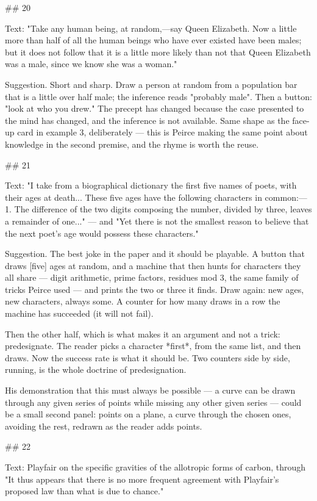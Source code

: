 ## 20

Text: "Take any human being, at random,—say Queen Elizabeth. Now a little more
than half of all the human beings who have ever existed have been males; but it
does not follow that it is a little more likely than not that Queen Elizabeth
was a male, since we know she was a woman."

Suggestion. Short and sharp. Draw a person at random from a population bar that
is a little over half male; the inference reads "probably male". Then a button:
"look at who you drew." The precept has changed because the case presented to
the mind has changed, and the inference is not available. Same shape as the
face-up card in example 3, deliberately — this is Peirce making the same point
about knowledge in the second premise, and the rhyme is worth the reuse.


## 21

Text: "I take from a biographical dictionary the first five names of poets, with
their ages at death... These five ages have the following characters in
common:— 1. The difference of the two digits composing the number, divided by
three, leaves a remainder of one..." — and "Yet there is not the smallest reason
to believe that the next poet's age would possess these characters."

Suggestion. The best joke in the paper and it should be playable. A button that
draws [five] ages at random, and a machine that then hunts for characters they
all share — digit arithmetic, prime factors, residues mod 3, the same family of
tricks Peirce used — and prints the two or three it finds. Draw again: new ages,
new characters, always some. A counter for how many draws in a row the machine
has succeeded (it will not fail).

Then the other half, which is what makes it an argument and not a trick:
predesignate. The reader picks a character *first*, from the same list, and then
draws. Now the success rate is what it should be. Two counters side by side,
running, is the whole doctrine of predesignation.

His demonstration that this must always be possible — a curve can be drawn
through any given series of points while missing any other given series — could
be a small second panel: points on a plane, a curve through the chosen ones,
avoiding the rest, redrawn as the reader adds points.


## 22

Text: Playfair on the specific gravities of the allotropic forms of carbon,
through "It thus appears that there is no more frequent agreement with
Playfair's proposed law than what is due to chance."

